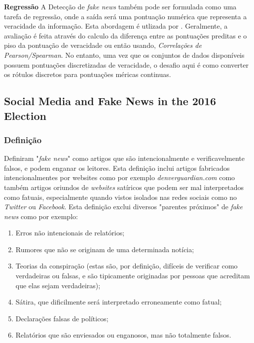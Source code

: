 \textbf{Regressão} A Detecção de \textit{fake news} também pode ser formulada como uma tarefa de regressão, onde a saída será uma pontuação numérica que representa a veracidade da informação. Esta abordagem é utlizada por \cite{nakashole2014}. Geralmente, a avaliação é feita através do calculo da diferença entre as pontuações preditas e o piso da pontuação de veracidade ou então usando, \textit{Correlações de Pearson/Spearman}. No entanto, uma vez que os conjuntos de dados disponíveis possuem pontuações discretizadas de veracidade, o desafio aqui é como converter os rótulos discretos para pontuações méricas continuas. \\


\subsection{Social Media and Fake News in the 2016 Election}

\subsubsection{Definição}

\cite{allcot2017} Definiram "\textit{fake news}" como artigos que são intencionalmente e verificavelmente falsos, e podem enganar os leitores. Esta definição inclui artigos fabricados intencionalmentes por websites como por exemplo \textit{denverguardian.com} como também artigos oriundos de \textit{websites} satíricos que podem ser mal interpretados como fatuais, especialmente quando vistos isolados nas redes sociais como no \textit{Twitter} ou \textit{Facebook}. Esta definição exclui diversos "parentes próximos" de \textit{fake news} como por exemplo:

\begin{enumerate}
    \item Erros não intencionais de relatórios;
    \item Rumores que não se originam de uma determinada notícia;
    \item Teorias da conspiração (estas são, por definição, difíceis de verificar como verdadeiras ou falsas, e são tipicamente originadas por pessoas que acreditam que elas sejam verdadeiras);
    \item Sátira, que dificilmente será interpretado erroneamente como fatual;
    \item Declarações falsas de políticos;
    \item Relatórios que são enviesados ou enganosos, mas não totalmente falsos.
\end{enumerate}


